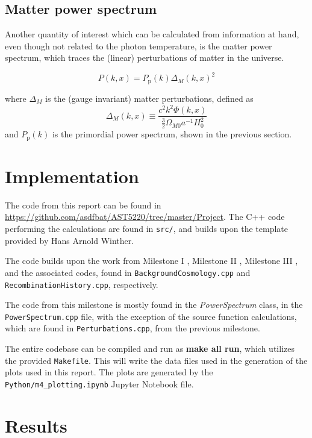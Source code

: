 \documentclass[10pt, a4paper]{article}
\begin{document}
\subsection{Matter power spectrum}
Another quantity of interest which can be calculated from information at hand, even though not related to the photon temperature, is the matter power spectrum, which traces the (linear) perturbations of matter in the universe.

\begin{equation}
    P(k, x) = P_{\text {p}}(k) \Delta_{M}(k, x)^{2}
\end{equation}

where $\Delta_M$ is the (gauge invariant) matter perturbations, defined as
\begin{equation}
    \Delta_{M}(k, x) \equiv \frac{c^{2} k^{2} \Phi(k, x)}{\frac{3}{2} \Omega_{M 0} a^{-1} H_{0}^{2}}
\end{equation}
and $P_\text{p}(k)$ is the primordial power spectrum, shown in the previous section.



\section{Implementation}
The code from this report can be found in \url{https://github.com/asdfbat/AST5220/tree/master/Project}. The C++ code performing the calculations are found in \texttt{src/}, and builds upon the template provided by Hans Arnold Winther.

The code builds upon the work from Milestone I \cite{Milestone1}, Milestone II \cite{Milestone2}, Milestone III \cite{Milestone3}, and the associated codes, found in \texttt{BackgroundCosmology.cpp} and \texttt{RecombinationHistory.cpp}, respectively.

The code from this milestone is mostly found in the \textit{PowerSpectrum} class, in the \texttt{PowerSpectrum.cpp} file, with the exception of the source function calculations, which are found in \texttt{Perturbations.cpp}, from the previous milestone.

The entire codebase can be compiled and run as \textbf{make all run}, which utilizes the provided \texttt{Makefile}. This will write the data files used in the generation of the plots used in this report. The plots are generated by the \texttt{Python/m4\_plotting.ipynb} Jupyter Notebook file.



\section{Results}
\end{document}
